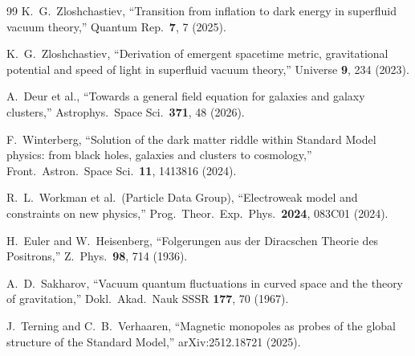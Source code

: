 \documentclass[aps,prd,twocolumn,superscriptaddress,nofootinbib]{revtex4-2}
\begin{document}
\begin{thebibliography}{99}
K.~G.~Zloshchastiev,
``Transition from inflation to dark energy in superfluid vacuum
theory,''
Quantum Rep.\ \textbf{7}, 7 (2025).

K.~G.~Zloshchastiev,
``Derivation of emergent spacetime metric, gravitational potential
and speed of light in superfluid vacuum theory,''
Universe \textbf{9}, 234 (2023).

A.~Deur et al.,
``Towards a general field equation for galaxies and galaxy
clusters,''
Astrophys.\ Space Sci.\ \textbf{371}, 48 (2026).

F.~Winterberg,
``Solution of the dark matter riddle within Standard Model physics:
from black holes, galaxies and clusters to cosmology,''
Front.\ Astron.\ Space Sci.\ \textbf{11}, 1413816 (2024).

R.~L.~Workman et al.\ (Particle Data Group),
``Electroweak model and constraints on new physics,''
Prog.\ Theor.\ Exp.\ Phys.\ \textbf{2024}, 083C01 (2024).

H.~Euler and W.~Heisenberg,
``Folgerungen aus der Diracschen Theorie des Positrons,''
Z.~Phys.\ \textbf{98}, 714 (1936).

A.~D.~Sakharov,
``Vacuum quantum fluctuations in curved space and the theory of
gravitation,''
Dokl.\ Akad.\ Nauk SSSR \textbf{177}, 70 (1967).

J.~Terning and C.~B.~Verhaaren,
``Magnetic monopoles as probes of the global structure of the
Standard Model,''
arXiv:2512.18721 (2025).

\end{thebibliography}
\end{document}
